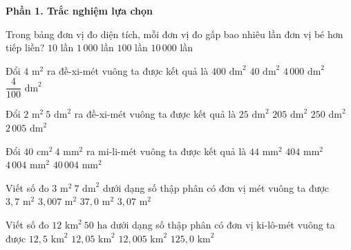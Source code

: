 \textbf{Phần 1. Trắc nghiệm lựa chọn}

\begin{ex} %
Trong bảng đơn vị đo diện tích, mỗi đơn vị đo gấp bao nhiêu lần đơn vị bé hơn tiếp liền?
\choice
{$10$ lần}
{$1\,000$ lần}
{\True $100$ lần}
{$10\,000$ lần}
\end{ex}

\begin{ex} %
Đổi $4\text{ m}^2$ ra đề-xi-mét vuông ta được kết quả là
\choice
{\True $400\text{ dm}^2$}
{$40\text{ dm}^2$}
{$4\,000\text{ dm}^2$}
{$\dfrac{4}{100}\text{ dm}^2$}
\end{ex}

\begin{ex} %
Đổi $2\text{ m}^2\ 5\text{ dm}^2$ ra đề-xi-mét vuông ta được kết quả là
\choice
{$25\text{ dm}^2$}
{\True $205\text{ dm}^2$}
{$250\text{ dm}^2$}
{$2\,005\text{ dm}^2$}
\end{ex}

\begin{ex} %
Đổi $40\text{ cm}^2\ 4\text{ mm}^2$ ra mi-li-mét vuông ta được kết quả là
\choice
{$44\text{ mm}^2$}
{$404\text{ mm}^2$}
{\True $4\,004\text{ mm}^2$}
{$40\,004\text{ mm}^2$}
\end{ex}

\begin{ex} %
Viết số đo $3\text{ m}^2\ 7\text{ dm}^2$ dưới dạng số thập phân có đơn vị mét vuông ta được
\choice
{$3{,}7\text{ m}^2$}
{$3{,}007\text{ m}^2$}
{$37{,}0\text{ m}^2$}
{\True $3{,}07\text{ m}^2$}
\end{ex}

\begin{ex} %
Viết số đo $12\text{ km}^2\ 50\text{ ha}$ dưới dạng số thập phân có đơn vị ki-lô-mét vuông ta được
\choice
{\True $12{,}5\text{ km}^2$}
{$12{,}05\text{ km}^2$}
{$12{,}005\text{ km}^2$}
{$125{,}0\text{ km}^2$}
\end{ex}

